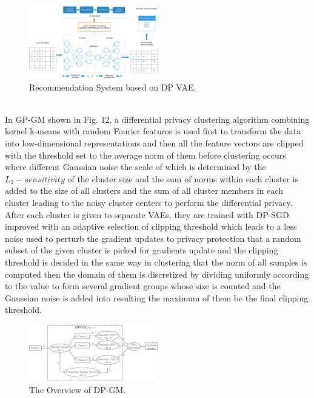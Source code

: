 \documentclass[conference]{IEEEtran}
\begin{document}
\begin{figure}[htbp]
    \centerline{\includegraphics[width=0.5\textwidth,height=0.25\textwidth]{Recommendation System based on DP VAE.jpg}}
    \caption{Recommendation System based on DP VAE.}
    \label{fig11}
\end{figure}\\
In GP-GM\cite{b48} shown in Fig. 12, a differential privacy clustering algorithm combining kernel k-means with random Fourier features is used first to transform the data into low-dimensional representations and then all the feature vectors are clipped with the threshold set to the average norm of them before clustering occurs where different Gaussian noise the scale of which is determined by the $L_2-sensitivity$ of the cluster size and the sum of norms within each cluster is added to the size of all clusters and the sum of all cluster members in each cluster leading to the noisy cluster centers to perform the differential privacy. After each cluster is given to separate VAEs, they are trained with DP-SGD improved with an adaptive selection of clipping threshold which leads to a less noise used to perturb the gradient updates to privacy protection that a random subset of the given cluster is picked for gradients update and the clipping threshold is decided in the same way in clustering that the norm of all samples is computed then the domain of them is discretized by dividing uniformly according to the value to form several gradient groups whose size is counted and the Gaussian noise is added into resulting the maximum of them be the final clipping threshold. 
\begin{figure}[htbp]
    \centerline{\includegraphics[width=0.5\textwidth,height=0.25\textwidth]{DP-GM.png}}
    \caption{The Overview of DP-GM.}
    \label{fig12}
\end{figure}\\
\end{document}
